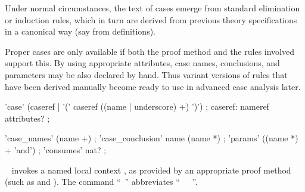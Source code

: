 \begin{isabellebody}
\begin{isamarkuptext}
  Under normal circumstances, the text of cases emerge from standard
  elimination or induction rules, which in turn are derived from
  previous theory specifications in a canonical way (say from
  \hyperlink{command.inductive}{\mbox{}} definitions).

  \medskip Proper cases are only available if both the proof method
  and the rules involved support this.  By using appropriate
  attributes, case names, conclusions, and parameters may be also
  declared by hand.  Thus variant versions of rules that have been
  derived manually become ready to use in advanced case analysis
  later.

  \begin{rail}
    'case' (caseref | '(' caseref ((name | underscore) +) ')')
    ;
    caseref: nameref attributes?
    ;

    'case\_names' (name +)
    ;
    'case\_conclusion' name (name *)
    ;
    'params' ((name *) + 'and')
    ;
    'consumes' nat?
    ;
  \end{rail}

  \begin{description}
  
  \item \hyperlink{command.case}{\mbox{}}~ invokes a named local
  context , as provided by an
  appropriate proof method (such as \hyperlink{method.cases}{\mbox{}} and
  \hyperlink{method.induct}{\mbox{}}).  The command ``\hyperlink{command.case}{\mbox{}}~'' abbreviates ``\hyperlink{command.fix}{\mbox{}}~~\hyperlink{command.assume}{\mbox{}}~''.


\end{description}
\end{isamarkuptext}
\end{isabellebody}
